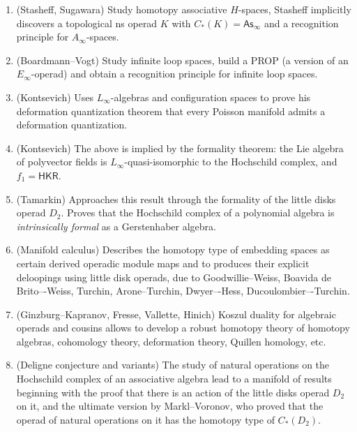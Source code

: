 \documentclass[fleqn, a4paper, twoside]{article}
\newcommand{\0}{\langle 0\rangle}
\newenvironment{tenumerate}{
 \begin{enumerate}
  \setlength{\itemsep}{0pt}
  \setlength{\parskip}{0pt}
}{\end{enumerate}}
\DeclareRobustCommand{\[}{\begin{equation}}%
\DeclareRobustCommand{\]}{\end{equation}}%
\theoremstyle{mytheorem}
\theoremstyle{introthm}
\theoremstyle{mydefinition}
\theoremstyle{mydefinition2}
\theoremstyle{plain} %
\newcommand{\?}{\,?\,}
\theoremstyle{mytheorem}
\theoremstyle{plain} %
\begin{document}
\begin{tenumerate}
\item (Stasheff, Sugawara) Study homotopy associative 
$H$-spaces, Stasheff implicitly discovers a topological
ns operad $K$ with $C_*(K) = \mathsf{As}_\infty$ and a
recognition principle for $A_\infty$-spaces.

\item (Boardmann--Vogt) Study infinite loop spaces,
build a PROP (a version of an $E_\infty$-operad) 
and obtain a recognition principle for infinite
loop spaces.

\item (Kontsevich) Uses $L_\infty$-algebras and
configuration spaces to prove his deformation
quantization theorem that every Poisson manifold
admits a deformation quantization.

\item (Kontsevich) The above is
implied by the formality theorem: the
Lie algebra of polyvector fields is 
$L_\infty$-quasi-isomorphic to the Hochschild
complex, and $f_1 = \mathsf{HKR}$. 

\item (Tamarkin) Approaches this result through 
the formality of the little disks operad $D_2$.
Proves that the Hochschild complex of a polynomial
algebra is \emph{intrinsically formal} as a 
Gerstenhaber algebra.

\item (Manifold calculus) Describes the
homotopy type of embedding spaces as certain 
derived operadic module maps and to
produces their explicit deloopings
using little disk operads, due to 
Goodwillie--Weiss, Boavida de Brito–-Weiss,
Turchin, Arone--Turchin, Dwyer–-Hess,
Ducoulombier–-Turchin. 

\item (Ginzburg--Kapranov, Fresse,
Vallette, Hinich) Koszul duality for algebraic 
operads and cousins allows to develop a robust 
homotopy theory of homotopy algebras, cohomology
theory, deformation theory, Quillen homology, etc. 

\item (Deligne conjecture and variants) The study
of natural operations on the Hochschild complex
of an associative algebra lead to a manifold of 
results beginning with the proof that there is
an action of the little disks operad $D_2$ on
it, and the ultimate version by Markl--Voronov,
who proved that the operad of natural operations
on it has the homotopy type of $C_*(D_2)$.  
\end{tenumerate}
\end{document}
